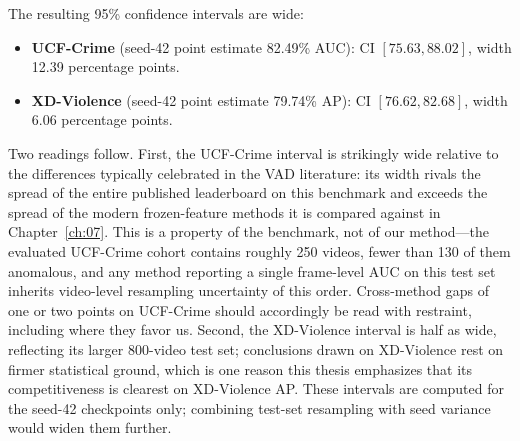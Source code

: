 The resulting 95\% confidence intervals are wide:

\begin{itemize}
    \item \textbf{UCF-Crime} (seed-42 point estimate 82.49\% AUC): CI
    $[75.63, 88.02]$, width 12.39 percentage points.
    \item \textbf{XD-Violence} (seed-42 point estimate 79.74\% AP): CI
    $[76.62, 82.68]$, width 6.06 percentage points.
\end{itemize}

Two readings follow. First, the UCF-Crime interval is strikingly wide
relative to the differences typically celebrated in the VAD literature: its
width rivals the spread of the entire published leaderboard on this
benchmark and exceeds the spread of the modern frozen-feature methods it is
compared against in Chapter~\ref{ch:07}. This is a property of the benchmark, not of our method---the
evaluated UCF-Crime cohort contains roughly 250 videos, fewer than 130 of
them anomalous, and any method reporting a single frame-level AUC on this
test set inherits video-level resampling uncertainty of this order.
Cross-method gaps of one or two points on UCF-Crime should accordingly be
read with restraint, including where they favor us. Second, the XD-Violence
interval is half as wide, reflecting its larger 800-video test set;
conclusions drawn on XD-Violence rest on firmer statistical ground, which is
one reason this thesis emphasizes that its competitiveness is clearest on
XD-Violence AP. These intervals are computed for the seed-42 checkpoints
only; combining test-set resampling with seed variance would widen them
further.

